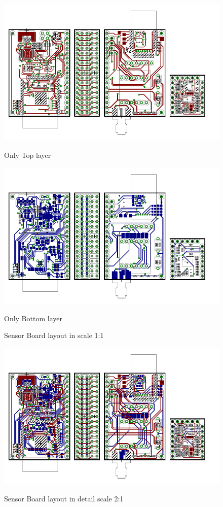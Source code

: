 \begin{figure}
	\centering
	\includegraphics[scale=1]{img/brdTop.pdf}
	\begin{center}
		Only Top layer
	\end{center}
	\includegraphics[scale=1]{img/brdBottom.pdf}
	\begin{center}
		Only Bottom layer
	\end{center}
	\label{brd1}
	\caption{Sensor Board layout in scale 1:1}
\end{figure}

\begin{figure}
	\centering
	\vspace{-1.75cm}
	\includegraphics[angle=90, scale=2]{img/brd.pdf}
	\label{brd2}
	\caption{Sensor Board layout in detail scale 2:1}
\end{figure}

